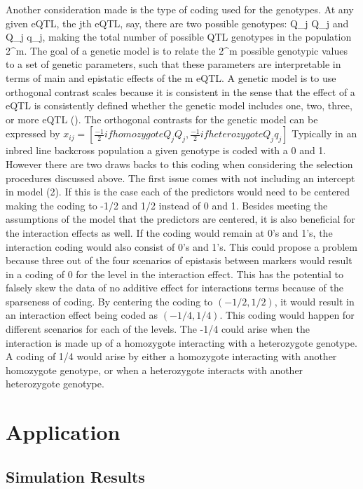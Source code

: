\documentclass[11pt,]{book}
\theoremstyle{definition}
\theoremstyle{definition}
\theoremstyle{remark}
\begin{document}
Another consideration made is the type of coding used for the genotypes.
At any given eQTL, the jth eQTL, say, there are two possible genotypes:
Q\_j Q\_j and Q\_j q\_j, making the total number of possible QTL
genotypes in the population 2\^{}m. The goal of a genetic model is to
relate the 2\^{}m possible genotypic values to a set of genetic
parameters, such that these parameters are interpretable in terms of
main and epistatic effects of the m eQTL. A genetic model is to use
orthogonal contrast scales because it is consistent in the sense that
the effect of a eQTL is consistently defined whether the genetic model
includes one, two, three, or more eQTL (\cite{kao2002modeling}). The
orthogonal contrasts for the genetic model can be expressed by
\(x_{ij} = \left[\frac{-1}{2} if homozygote Q_j Q_j, \frac{-1}{2} if heterozygote Q_j q_j \right]\)
Typically in an inbred line backcross population a given genotype is
coded with a 0 and 1. However there are two draws backs to this coding
when considering the selection procedures discussed above. The first
issue comes with not including an intercept in model (2). If this is the
case each of the predictors would need to be centered making the coding
to -1/2 and 1/2 instead of 0 and 1. Besides meeting the assumptions of
the model that the predictors are centered, it is also beneficial for
the interaction effects as well. If the coding would remain at 0's and
1's, the interaction coding would also consist of 0's and 1's. This
could propose a problem because three out of the four scenarios of
epistasis between markers would result in a coding of 0 for the level in
the interaction effect. This has the potential to falsely skew the data
of no additive effect for interactions terms because of the sparseness
of coding. By centering the coding to \((-1/2,1/2)\), it would result in
an interaction effect being coded as \((-1/4,1/4)\). This coding would
happen for different scenarios for each of the levels. The -1/4 could
arise when the interaction is made up of a homozygote interacting with a
heterozygote genotype. A coding of 1/4 would arise by either a
homozygote interacting with another homozygote genotype, or when a
heterozygote interacts with another heterozygote genotype.

\section{Application}\label{application}

\subsection{Simulation Results}\label{simulation-results}
\end{document}

